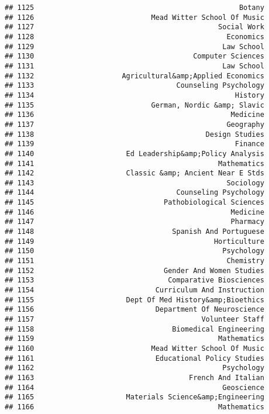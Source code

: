 \documentclass[
]{article}
\begin{document}
\begin{verbatim}
## 1125                                                 Botany
## 1126                            Mead Witter School Of Music
## 1127                                            Social Work
## 1128                                              Economics
## 1129                                             Law School
## 1130                                      Computer Sciences
## 1131                                             Law School
## 1132                     Agricultural&amp;Applied Economics
## 1133                                  Counseling Psychology
## 1134                                                History
## 1135                            German, Nordic &amp; Slavic
## 1136                                               Medicine
## 1137                                              Geography
## 1138                                         Design Studies
## 1139                                                Finance
## 1140                      Ed Leadership&amp;Policy Analysis
## 1141                                            Mathematics
## 1142                      Classic &amp; Ancient Near E Stds
## 1143                                              Sociology
## 1144                                  Counseling Psychology
## 1145                               Pathobiological Sciences
## 1146                                               Medicine
## 1147                                               Pharmacy
## 1148                                 Spanish And Portuguese
## 1149                                           Horticulture
## 1150                                             Psychology
## 1151                                              Chemistry
## 1152                               Gender And Women Studies
## 1153                                Comparative Biosciences
## 1154                             Curriculum And Instruction
## 1155                      Dept Of Med History&amp;Bioethics
## 1156                             Department Of Neuroscience
## 1157                                        Volunteer Staff
## 1158                                 Biomedical Engineering
## 1159                                            Mathematics
## 1160                            Mead Witter School Of Music
## 1161                             Educational Policy Studies
## 1162                                             Psychology
## 1163                                     French And Italian
## 1164                                             Geoscience
## 1165                      Materials Science&amp;Engineering
## 1166                                            Mathematics

\end{verbatim}
\end{document}
